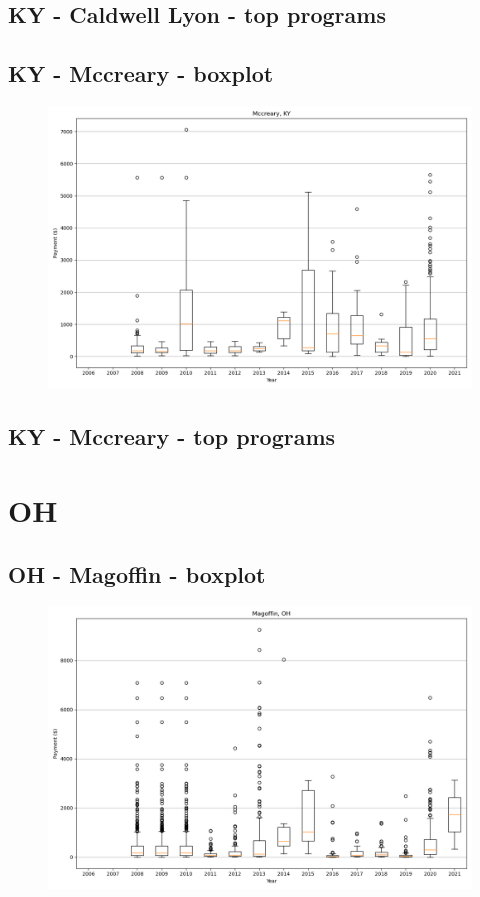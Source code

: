 \subsection*{KY - Caldwell Lyon - top programs}

\newpage
\subsection*{KY - Mccreary - boxplot}
\begin{figure}[h]
\centering
\includegraphics[width=7in]{../output/boxplots/counties/Mccreary-KY_boxplot.png}
\end{figure}


\subsection*{KY - Mccreary - top programs}

\newpage
\section*{OH}
\subsection*{OH - Magoffin - boxplot}
\begin{figure}[h]
\centering
\includegraphics[width=7in]{../output/boxplots/counties/Magoffin-OH_boxplot.png}
\end{figure}


